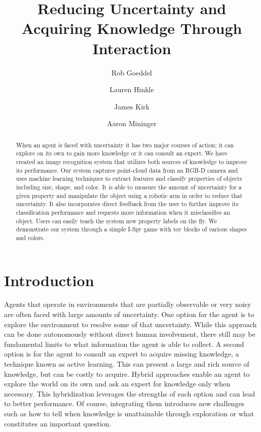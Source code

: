 \documentclass[11pt]{article}
\title{Reducing Uncertainty and Acquiring Knowledge Through Interaction}
\author{Rob Goeddel \and Lauren Hinkle \and James Kirk \and Aaron Mininger}
\date{}
\newcommand{\xxx}[1]{{\bf \color{red} #1}}
\begin{document}
\maketitle


\begin{abstract}
When an agent is faced with uncertainty it has two major courses of action: it
can explore on its own to gain more knowledge or it can consult an expert. We
have created an image recognition system that utilizes both sources of
knowledge to improve its performance. Our system captures point-cloud data
from an RGB-D camera and uses machine learning techniques to extract features
and classify properties of objects including size, shape, and color. It is
able to measure the amount of uncertainty for a given property and manipulate
the object using a robotic arm in order to reduce that uncertainty. It also
incorporates direct feedback from the user to further improve its
classification performance and requests more information when it misclassifies
an object. Users can easily teach the system new property labels on the fly.
We demonstrate our system through a simple I-Spy game with toy blocks of
various shapes and colors.
\end{abstract}


\section{Introduction}
Agents that operate in environments that are partially observable or very
noisy are often faced with large amounts of uncertainty. One option for the
agent is to explore the environment to resolve some of that uncertainty. While
this approach can be done autonomously without direct human involvement, there
still may be fundamental limits to what information the agent is able to
collect. A second option is for the agent to consult an expert to acquire
missing knowledge, a technique known as active learning. This can present a
large and rich source of knowledge, but can be costly to acquire. Hybrid
approaches enable an agent to explore the world on its own and ask an expert
for knowledge only when necessary. This hybridization leverages the
strengths of each option and can lead to better performance. Of course,
          integrating them introduces new challenges such as how to tell when
          knowledge is unattainable through exploration or what constitutes an
          important question.
\end{document}
